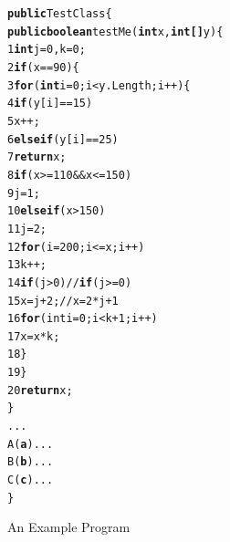 {\begin{figure}[t]
\begin{CodeOut}
\begin{alltt}
  \textbf{public} TestClass\{
  \hspace{0.5cm}\textbf{public boolean} testMe(\textbf{int }x, \textbf{int[] } y)\{
1 \hspace{1.0cm} \textbf{int} j=0, k=0;
2 \hspace{1.0cm} \textbf{if}(x==90)\{
3 \hspace{1.5cm} \textbf{for}(\textbf{int} i=0; i< y.Length; i++)\{
4 \hspace{2.0cm} \textbf{if}(y[i] == 15)
5 \hspace{2.5cm} x++;
6 \hspace{2.0cm} \textbf{else if}(y[i] == 25)
7 \hspace{2.5cm} \textbf{return} x;
8 \hspace{2.0cm} \textbf{if}(x >= 110 && x<= 150)
9 \hspace{2.5cm} j =1;
10\hspace{2.0cm} \textbf{else if}(x>150)
11\hspace{2.5cm} j =2;
12\hspace{2.0cm} \textbf{for}(i=200; i<= x; i++)
13\hspace{2.5cm} k++;
14\hspace{2.0cm} \textbf{if}(j > 0) // \textbf{if}(j >= 0)
15\hspace{2.5cm} x = j+2; //x = 2*j+1
16\hspace{2.0cm} \textbf{for}(int i=0; i< k+1; i++) 
17\hspace{2.5cm} x = x*k;
18\hspace{1.5cm} \}
19\hspace{1.0cm} \}
20\hspace{1.0cm} \textbf{return} x;
  \hspace{0.5cm}\}
  \hspace{0.5cm}...
  \hspace{0.5cm}A (\textbf{a})...
  \hspace{0.5cm}B (\textbf{b})...
  \hspace{0.5cm}C (\textbf{c})...
  \}  
\end{alltt}
\end{CodeOut}
\vspace{-0.15 in}
\caption{An Example Program}
\vspace{-0.55 in}
\label{fig:example}
\end{figure}


}
